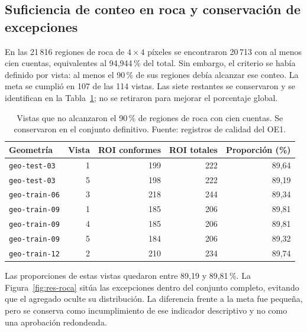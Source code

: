 \subsection{Suficiencia de conteo en roca y conservación de excepciones}
En las 21\,816 regiones de roca de $4\times4$ píxeles se encontraron 20\,713 con al menos cien cuentas, equivalentes al 94,944\,\% del total. Sin embargo, el criterio se había definido por vista: al menos el 90\,\% de sus regiones debía alcanzar ese conteo. La meta se cumplió en 107 de las 114 vistas. Las siete restantes se conservaron y se identifican en la Tabla~\ref{tab:res-roca}; no se retiraron para mejorar el porcentaje global.
\begin{table}[htbp]\centering\small
\caption[Vistas bajo la meta descriptiva de roca]{Vistas que no alcanzaron el 90\,\% de regiones de roca con cien cuentas. Se conservaron en el conjunto definitivo. Fuente: registros de calidad del OE1.}\label{tab:res-roca}
\begin{tabular}{@{}lrrrr@{}}\toprule
Geometría & Vista & ROI conformes & ROI totales & Proporción (\%)\\\midrule
\texttt{geo-test-03} & 1 & 199 & 222 & 89{,}64\\
\texttt{geo-test-03} & 5 & 198 & 222 & 89{,}19\\
\texttt{geo-train-06} & 3 & 218 & 244 & 89{,}34\\
\texttt{geo-train-09} & 1 & 185 & 206 & 89{,}81\\
\texttt{geo-train-09} & 4 & 185 & 206 & 89{,}81\\
\texttt{geo-train-09} & 5 & 184 & 206 & 89{,}32\\
\texttt{geo-train-12} & 2 & 210 & 234 & 89{,}74\\
\bottomrule\end{tabular}\end{table}

Las proporciones de estas vistas quedaron entre 89,19 y 89,81\,\%. La Figura~\ref{fig:res-roca} sitúa las excepciones dentro del conjunto completo, evitando que el agregado oculte su distribución. La diferencia frente a la meta fue pequeña, pero se conserva como incumplimiento de ese indicador descriptivo y no como una aprobación redondeada.

